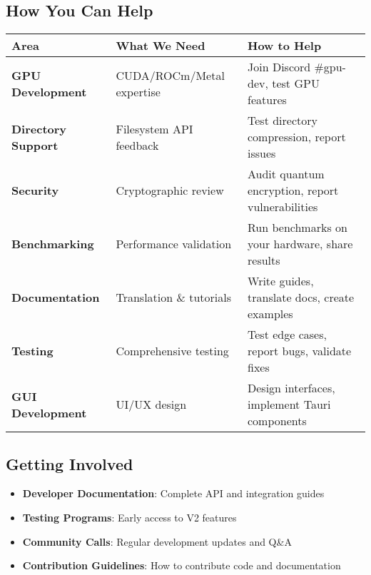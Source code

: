 \documentclass[12pt,a4paper]{article}
\begin{document}
\subsection{How You Can Help}

\begin{center}
\begin{tabular}{|l|l|l|}
\hline
\textbf{Area} & \textbf{What We Need} & \textbf{How to Help} \\
\hline
\textbf{GPU Development} & CUDA/ROCm/Metal expertise & Join Discord \#gpu-dev, test GPU features \\
\hline
\textbf{Directory Support} & Filesystem API feedback & Test directory compression, report issues \\
\hline
\textbf{Security} & Cryptographic review & Audit quantum encryption, report vulnerabilities \\
\hline
\textbf{Benchmarking} & Performance validation & Run benchmarks on your hardware, share results \\
\hline
\textbf{Documentation} & Translation \& tutorials & Write guides, translate docs, create examples \\
\hline
\textbf{Testing} & Comprehensive testing & Test edge cases, report bugs, validate fixes \\
\hline
\textbf{GUI Development} & UI/UX design & Design interfaces, implement Tauri components \\
\hline
\end{tabular}
\end{center}

\subsection{Getting Involved}
\begin{itemize}
    \item \textbf{Developer Documentation}: Complete API and integration guides
    \item \textbf{Testing Programs}: Early access to V2 features
    \item \textbf{Community Calls}: Regular development updates and Q\&A
    \item \textbf{Contribution Guidelines}: How to contribute code and documentation
\end{itemize}

\end{document}
